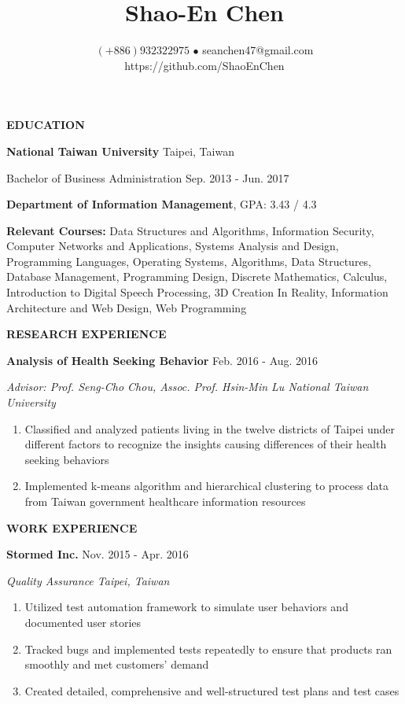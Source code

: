 \documentclass[12pt]{article}
\title{\vspace{-1in}Shao-En Chen}
\author{
	$(\texttt{+}886) 932322975$ $\bullet$ seanchen47@gmail.com
	\\https://github.com/ShaoEnChen
}
\date{}
\begin{document}
\maketitle

\textbf{\large{\uppercase{Education}}}
\hrulefill{}

	\textbf{National Taiwan University} \hfill{Taipei, Taiwan}

	Bachelor of Business Administration \hfill{Sep. 2013 - Jun. 2017}

	\textbf{Department of Information Management}, GPA: 3.43 / 4.3

	\textbf{Relevant Courses: }
	Data Structures and Algorithms, Information Security, Computer Networks and Applications, Systems Analysis and Design, Programming Languages, Operating Systems, Algorithms, Data Structures, Database Management, Programming Design, Discrete Mathematics, Calculus, Introduction to Digital Speech Processing, 3D Creation In Reality, Information Architecture and Web Design, Web Programming

	\vspace{1em}

\textbf{\large{\uppercase{Research Experience}}}
\hrulefill{}

	\textbf{Analysis of Health Seeking Behavior} \hfill{Feb. 2016 - Aug. 2016}

	\textit{Advisor: Prof. Seng-Cho Chou, Assoc. Prof. Hsin-Min Lu \hfill{National Taiwan University}}

	\begin{enumerate}

		\item Classified and analyzed patients living in the twelve districts of Taipei under different factors to recognize the insights causing differences of their health seeking behaviors

		\item Implemented k-means algorithm and hierarchical clustering to process data from Taiwan government healthcare information resources

	\end{enumerate}

	\vspace{1em}

\textbf{\large{\uppercase{Work Experience}}}
\hrulefill{}

	\textbf{Stormed Inc.} \hfill{Nov. 2015 - Apr. 2016}

	\textit{Quality Assurance \hfill{Taipei, Taiwan}}

	\begin{enumerate}

		\item Utilized test automation framework to simulate user behaviors and documented user stories

		\item Tracked bugs and implemented tests repeatedly to ensure that products ran smoothly and met customers' demand

		\item Created detailed, comprehensive and well-structured test plans and test cases

	\end{enumerate}
\end{document}
